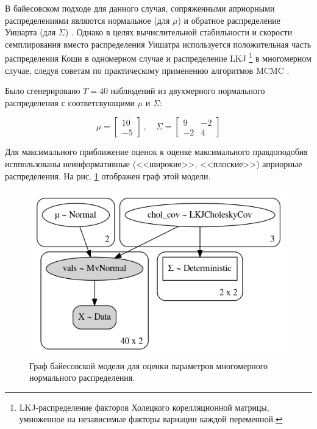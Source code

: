 \documentclass[a4paper,14pt]{extreport}
\begin{document}
В байесовском подходе для данного случая, сопряженными априорными распределениями являются нормальное (для $\mu$) и обратное распределение Уишарта (для $\Sigma$) \cite{stan_user_guide}. Однако в целях вычислительной стабильности и скорости семплирования вместо распределения Уишатра используется положительная часть распределения Коши в одномерном случае и распределение LKJ \cite{lkj_prior} \footnote{LKJ-распределение факторов Холецкого корелляционной матрицы, умноженное на независимые факторы вариации каждой переменной. } в многомерном случае, следуя советам по практическому применению алгоритмов MCMC \cite{stan_user_guide}.

Было сгенерировано $T=40$ наблюдений из двухмерного нормального распределения с соответсвующими $\mu$ и $\Sigma$:

\begin{equation}
	\mu = 
	\begin{bmatrix}
		10 \\
		-5
	\end{bmatrix}
	\	, \quad
	\Sigma = 
	\begin{bmatrix} 
		9  & -2 \\
		-2 & 4 
	\end{bmatrix}
\end{equation}

Для максимального приближение оценок к оценке максимального правдоподобия исппользованы неинформативные (<<широкие>>, <<плоские>>) априорные распределения. На рис. \ref{fig:pp_mvn_graph} отображен граф этой модели.

\begin{figure}[H]
	\includegraphics[width=\linewidth]{img/gen/pp_mvn_graph.png}
	\caption{Граф байесовской модели для оценки параметров многомерного нормального распределения. }
	\label{fig:pp_mvn_graph}
\end{figure}
\end{document}
